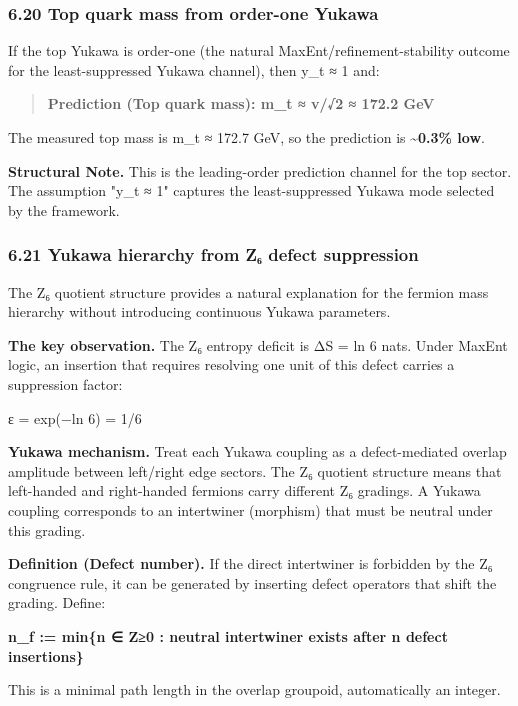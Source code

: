\subsubsection{6.20 Top quark mass from order-one Yukawa}\label{620-top-quark-mass-from-order-one-yukawa}

If the top Yukawa is order-one (the natural MaxEnt/refinement-stability outcome for the least-suppressed Yukawa channel), then y\_t ≈ 1 and:

\begin{quote}
\textbf{Prediction (Top quark mass): m\_t ≈ v/√2 ≈ 172.2 GeV}
\end{quote}

The measured top mass is m\_t ≈ 172.7 GeV, so the prediction is \textbf{\textasciitilde0.3\% low}.

\textbf{Structural Note.} This is the leading-order prediction channel for the top sector. The assumption "y\_t ≈ 1" captures the least-suppressed Yukawa mode selected by the framework.

\subsubsection{6.21 Yukawa hierarchy from Z₆ defect suppression}\label{621-yukawa-hierarchy-from-zux2086-defect-suppression}

The Z₆ quotient structure provides a natural explanation for the fermion mass hierarchy without introducing continuous Yukawa parameters.

\textbf{The key observation.} The Z₆ entropy deficit is ΔS = ln 6 nats. Under MaxEnt logic, an insertion that requires resolving one unit of this defect carries a suppression factor:

ε = exp(−ln 6) = 1/6

\textbf{Yukawa mechanism.} Treat each Yukawa coupling as a defect-mediated overlap amplitude between left/right edge sectors. The Z₆ quotient structure means that left-handed and right-handed fermions carry different Z₆ gradings. A Yukawa coupling corresponds to an intertwiner (morphism) that must be neutral under this grading.

\textbf{Definition (Defect number).} If the direct intertwiner is forbidden by the Z₆ congruence rule, it can be generated by inserting defect operators that shift the grading. Define:

\textbf{n\_f := min\{n ∈ Z≥0 : neutral intertwiner exists after n defect insertions\}}

This is a minimal path length in the overlap groupoid, automatically an integer.

